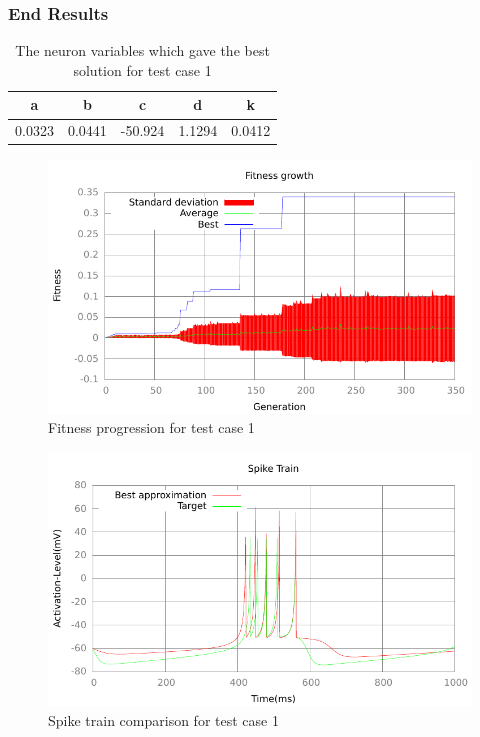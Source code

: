 \subsubsection{End Results}\label{sec:test-case-1-results}
\begin{table}[h]
	\begin{tabular}{c c c c c}
		a & b & c & d & k \\
		\hline
		0.0323 & 0.0441 & -50.924 & 1.1294 & 0.0412
	\end{tabular}
	\caption{The neuron variables which gave the best solution for test case
	1}
\end{table}
\begin{figure}[h]
	\centering
	\includegraphics{../output/stdm_izzy_1_fitness.pdf}
	\caption{Fitness progression for test case 1}
	\label{fig:fitness-test-case-1}
\end{figure}
\begin{figure}[h]
	\centering
	\includegraphics{../output/stdm_izzy_1_spike.pdf}
	\caption{Spike train comparison for test case 1}
	\label{fig:spike-test-case-1}
\end{figure}

